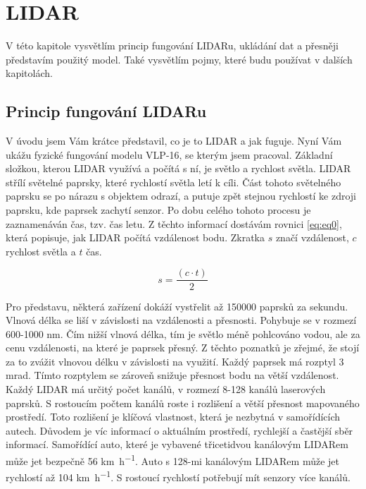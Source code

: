 \documentclass[czech,bachelor,dept420,male,cpdeclaration]{diploma}
\begin{document}
\section{LIDAR}
V této kapitole vysvětlím princip fungování LIDARu, ukládání dat a přesněji představím použitý model. Také vysvětlím pojmy, které budu používat v dalších kapitolách.
\subsection{Princip fungování LIDARu}
V úvodu jsem Vám krátce představil, co je to LIDAR a jak fuguje. Nyní Vám ukážu fyzické fungování modelu VLP-16, se kterým jsem pracoval.  
Základní složkou, kterou LIDAR využívá a počítá s ní, je světlo a rychlost světla. LIDAR střílí světelné paprsky, které rychlostí světla letí k cíli. Část tohoto světelného paprsku se po nárazu s objektem odrazí, a putuje zpět stejnou rychlostí ke zdroji paprsku, kde paprsek zachytí senzor. Po dobu celého tohoto procesu je zaznamenáván čas, tzv. čas letu. Z těchto informací dostávám rovnici \eqref{eq:eq0}, která popisuje, jak LIDAR počítá vzdálenost bodu. Zkratka $s$ značí vzdálenost, $c$ rychlost světla a $t$ čas.

\begin{equation}
		s = \frac{\left ( c \cdot t \right)}{2} 
\label{eq:eq0}
\end{equation}

Pro představu, některá zařízení dokáží vystřelit až \num{150000} paprsků za sekundu. Vlnová délka se liší v závislosti na vzdálenosti a přesnosti. Pohybuje se v rozmezí 600-1000 \si{\nano\metre}. Čím nižší vlnová délka, tím je světlo méně pohlcováno vodou, ale za cenu vzdálenosti, na které je paprsek přesný. Z těchto poznatků je zřejmé, že stojí za to zvážit vlnovou délku v závislosti na využití. Každý paprsek má rozptyl \num{3} \si{\milli\radian}. Tímto rozptylem se zároveň snižuje přesnost bodu na větší vzdálenost.
Každý LIDAR má určitý počet kanálů, v rozmezí 8-128 kanálů laserových paprsků. S rostoucím počtem kanálů roste i rozlišení a větší přesnost mapovaného prostředí. Toto rozlišení je klíčová vlastnost, která je nezbytná v samořídících autech. Důvodem je víc informací o aktuálním prostředí, rychlejší a častější sběr informací. Samořídící auto, které je vybavené třicetidvou kanálovým LIDARem může jet bezpečně \num{56} \si{\km\per\hour}. Auto s 128-mi kanálovým LIDARem může jet rychlostí až \num{104} \si{\km\per\hour}. S rostoucí rychlostí potřebují mít senzory více kanálů.
\end{document}
